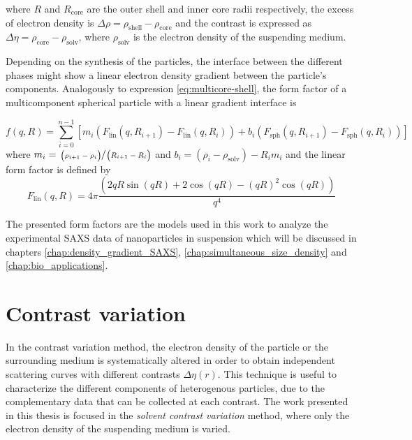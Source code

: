 where \(R \) and \(R_{\text{core}} \)  are the outer shell and inner core radii respectively, the excess of electron density is \(\Delta\rho=\rho_{\text{shell}}-\rho_{\text{core}}\) and the contrast is expressed as \(\Delta\eta=\rho_{\text{core}}-\rho_{\text{solv}}\), where $\rho_{\text{solv}}$ is the electron density of the suspending medium.

Depending on the synthesis of the particles, the interface between the different phases might show a linear electron density gradient between the particle's components. Analogously to expression \ref{eq:multicore-shell}, the form factor of a multicomponent spherical particle with a linear gradient interface is

\begin{equation}
f\left(q,R \right) = \sum_{i=0}^{n-1}\left[m_i \left( F_{\text{lin}}(q,R_{i+1})-F_{\text{lin}}(q,R_{i}) \right) +b_i \left( F_{\text{sph}}(q,R_{i+1})-F_{\text{sph}}(q,R_{i}) \right) \right]
\end{equation}
where $m_i=\sfrac{\left( \rho_{i+1}-\rho_{i} \right)}{\left( R_{i+1}-R_{i} \right)}$ and $b_i=\left( \rho_i-\rho_{\text{solv}} \right)-R_im_i$ and the linear form factor is defined by
\begin{equation}
F_{\text{lin}}(q,R) = 4\pi\frac{ \left( 2qR\sin(qR)+2\cos(qR)-(qR)^2\cos(qR) \right)}{q^4}
\end{equation}

The presented form factors are the models used in this work to analyze the experimental SAXS data of nanoparticles in suspension which will be discussed in chapters \ref{chap:density_gradient_SAXS}, \ref{chap:simultaneous_size_density} and \ref{chap:bio_applications}.

\section{Contrast variation}
\label{sec:contrast_variation_theory}

In the contrast variation method, the electron density of the particle or the surrounding medium is systematically altered in order to obtain independent scattering curves with different contrasts $\Delta \eta (r)$. This technique is useful to characterize the different components of heterogenous particles, due to the complementary data that can be collected at each contrast. The work presented in this thesis is focused in the \emph{solvent contrast variation} method, where only the electron density of the suspending medium is varied.

